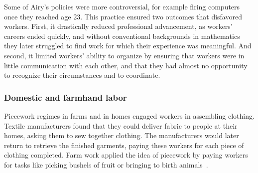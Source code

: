 \documentclass[pn4226]{subfiles}
\begin{document}
Some of Airy's policies were more controversial, for example
firing computers once they reached age 23.
This practice ensured two outcomes that disfavored workers.
First, it drastically reduced professional advancement, as
workers' careers ended quickly,
and without conventional backgrounds in mathematics
they later struggled to find work for which their experience was meaningful.
And second, it limited workers' ability to organize
by ensuring that workers were in little communication with each other,
and that they had almost no opportunity to recognize their circumstances and
to coordinate.



\subsubsection{Domestic and farmhand labor}

\begin{comment}
What did I pull from the threads that are related to domestic/farmwork?

- Graves: sparks of Scientific Management in Piecework, especially starting here
- 19th century: piecework was mostly cottage industry with untrained or informally trained workers
  (unlike industrial metal workers during WWII)
- Brown: Task variability matters
- Clark: pieceworkers work harder, more diligently, etc...
- Riis saw terrible conditions, documented and communicated it to the world

\ali{\citeauthor{clark1908cotton}} observed textile mill pieceworkers and reported,
``When he works by the day the Italian operative wishes to leave before the whistle blows,
but if he works by the piece he will work as many hours as it is possible for him to stand''~\cite{clark1908cotton}.
\end{comment}

Piecework regimes in farms and in homes engaged workers in assembling clothing. %
Textile manufacturers found that they could deliver fabric to people at their homes, asking them to sew together clothing.
The manufacturers would later return to retrieve the finished garments,
paying these workers for each piece of clothing completed. 
Farm work applied the idea of piecework by
paying workers for tasks like picking bushels of fruit or bringing to birth animals~\cite{10.2307/2338394}.
\end{document}

